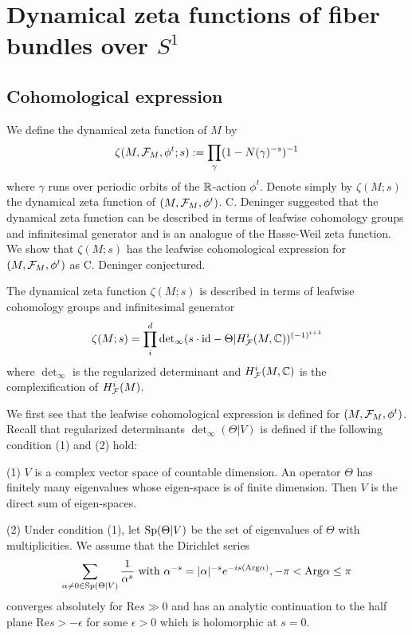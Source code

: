 \section{Dynamical zeta functions of fiber bundles over \texorpdfstring{$S^{1}$}{}}\label{section3}

\subsection{Cohomological expression}
We define the dynamical zeta function of $M$ by
\begin{equation*}
    \zeta(M,{\mathcal{F}}_{M},\phi^{t};s):=\prod_{\gamma}(1-N(\gamma)^{-s})^{-1}
\end{equation*}
where $\gamma$ runs over periodic orbits of the ${\mathbb{R}}$-action $\phi^{t}$.
Denote simply by $\zeta(M;s)$ the dynamical zeta function of $(M,{\mathcal{F}}_{M},\phi^{t})$.
C. Deninger suggested that the dynamical zeta function can be described in terms of leafwise cohomology groups and infinitesimal generator and is an analogue of the Hasse-Weil zeta function.
We show that $\zeta(M;s)$ has the leafwise cohomological expression for $(M,{\mathcal{F}}_{M},\phi^{t})$ as C. Deninger conjectured.

\begin{theorem}
The dynamical zeta function $\zeta(M;s)$ is described in terms of leafwise cohomology groups and infinitesimal generator 
    \begin{equation*}
        \zeta(M;s)=\prod_{i}^{d}{\mathrm{det}}_{\infty}(s\cdot\mbox{id}-\Theta|H^{i}_{{\mathcal{F}}}(M,{\mathbb{C}}))^{(-1)^{i+1}}
    \end{equation*}
where $\det_{\infty}$ is the regularized determinant and $H^{i}_{{\mathcal{F}}}(M,{\mathbb{C}})$ is the complexification of $H^{i}_{{\mathcal{F}}}(M)$.
\end{theorem}


We first see that the leafwise cohomological expression is defined for $(M,{\mathcal{F}}_{M},\phi^{t})$. 
Recall that regularized determinants $\det_{\infty}(\Theta|V)$ is defined if the following condition (1) and (2) hold:

(1) $V$ is a complex vector space of countable dimension.
An operator $\Theta$ has finitely many eigenvalues whose eigen-space is of finite dimension. Then $V$ is the direct sum of eigen-spaces.

(2) Under condition (1), let ${\mathrm{Sp}}(\Theta|V)$ be the set of eigenvalues of $\Theta$ with multiplicities.
We assume that the Dirichlet series
\begin{equation*}
    \sum_{\alpha\ne0\in{\mathrm{Sp}}(\Theta|V)}\frac{1}{\alpha^{s}}\mbox{ with }\alpha^{-s}=|\alpha|^{-s}e^{-is({\mathrm{Arg}}{\alpha})},-\pi<{\mathrm{Arg}}{\alpha}\le\pi
\end{equation*}
converges absolutely for $\mbox{Re}{s}\gg0$ and has an analytic continuation to the half plane $\mbox{Re}{s}>-\epsilon$ for some $\epsilon>0$ which is holomorphic at $s=0$.

